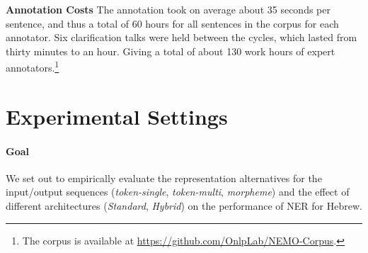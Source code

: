 \documentclass[11pt,a4paper]{article}
\newcommand{\TOKMACRO}{{\em token-single}\xspace}
\newcommand{\MULMACRO}{{\em token-multi}\xspace}
\newcommand{\MORMACRO}{{\em morpheme}\xspace}
\newcommand{\FLIPMACRO}{{\em Hybrid}\xspace}
\newcommand{\YAPMACRO}{{\em Standard}\xspace}
\begin{document}
{\bf Annotation Costs} The annotation took on average about 35 seconds per sentence, and thus a total of 60 hours for all sentences in the corpus for each annotator. Six clarification talks were held between the cycles, which lasted from thirty minutes to an hour. Giving a total of about 130 work hours of expert annotators.\footnote{The corpus is available at \scriptsize{\url{https://github.com/OnlpLab/NEMO-Corpus}}.}  
\label{subsec:costs}

\begin{table}[t]
\centering
{}
\caption{\label{tab:corpus-stats} 
Basic Corpus Statistics. Standard HTB Splits.}
\end{table}

\section{Experimental Settings}
\paragraph{Goal}
We set out to empirically evaluate the representation alternatives for the input/output sequences (\TOKMACRO, \MULMACRO, \MORMACRO)  and the effect of  different    architectures (\YAPMACRO,  \FLIPMACRO) on  the  performance  of  NER  for  Hebrew.
\end{document}
